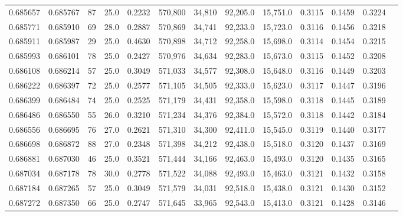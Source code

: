 \begin{tabular}{rrrrrrrrrrrrr}
0.685657 & 0.685767 &    87 & 25.0 &                                     0.2232 & 570,800 &  34,810 &  92,205.0 &  15,751.0 & 0.3115 & 0.1459 & 0.3224 \\
0.685771 & 0.685910 &    69 & 28.0 &                                     0.2887 & 570,869 &  34,741 &  92,233.0 &  15,723.0 & 0.3116 & 0.1456 & 0.3218 \\
0.685911 & 0.685987 &    29 & 25.0 &                                     0.4630 & 570,898 &  34,712 &  92,258.0 &  15,698.0 & 0.3114 & 0.1454 & 0.3215 \\
0.685993 & 0.686101 &    78 & 25.0 &                                     0.2427 & 570,976 &  34,634 &  92,283.0 &  15,673.0 & 0.3115 & 0.1452 & 0.3208 \\
0.686108 & 0.686214 &    57 & 25.0 &                                     0.3049 & 571,033 &  34,577 &  92,308.0 &  15,648.0 & 0.3116 & 0.1449 & 0.3203 \\
0.686222 & 0.686397 &    72 & 25.0 &                                     0.2577 & 571,105 &  34,505 &  92,333.0 &  15,623.0 & 0.3117 & 0.1447 & 0.3196 \\
0.686399 & 0.686484 &    74 & 25.0 &                                     0.2525 & 571,179 &  34,431 &  92,358.0 &  15,598.0 & 0.3118 & 0.1445 & 0.3189 \\
0.686486 & 0.686550 &    55 & 26.0 &                                     0.3210 & 571,234 &  34,376 &  92,384.0 &  15,572.0 & 0.3118 & 0.1442 & 0.3184 \\
0.686556 & 0.686695 &    76 & 27.0 &                                     0.2621 & 571,310 &  34,300 &  92,411.0 &  15,545.0 & 0.3119 & 0.1440 & 0.3177 \\
0.686698 & 0.686872 &    88 & 27.0 &                                     0.2348 & 571,398 &  34,212 &  92,438.0 &  15,518.0 & 0.3120 & 0.1437 & 0.3169 \\
0.686881 & 0.687030 &    46 & 25.0 &                                     0.3521 & 571,444 &  34,166 &  92,463.0 &  15,493.0 & 0.3120 & 0.1435 & 0.3165 \\
0.687034 & 0.687178 &    78 & 30.0 &                                     0.2778 & 571,522 &  34,088 &  92,493.0 &  15,463.0 & 0.3121 & 0.1432 & 0.3158 \\
0.687184 & 0.687265 &    57 & 25.0 &                                     0.3049 & 571,579 &  34,031 &  92,518.0 &  15,438.0 & 0.3121 & 0.1430 & 0.3152 \\
0.687272 & 0.687350 &    66 & 25.0 &                                     0.2747 & 571,645 &  33,965 &  92,543.0 &  15,413.0 & 0.3121 & 0.1428 & 0.3146 \\

\end{tabular}
